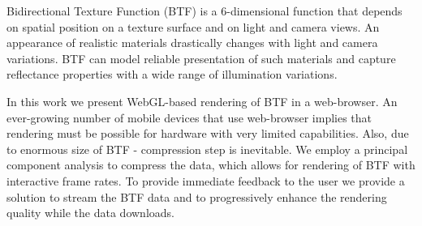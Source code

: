 Bidirectional Texture Function (BTF) is a 6-dimensional function that depends on spatial position on a texture surface and on light and camera views.
An appearance of realistic materials drastically changes with light and camera variations.
 BTF can model reliable presentation of such materials and capture reflectance properties with a wide range of illumination variations.

In this work we present WebGL-based rendering of BTF in a web-browser. 
An ever-growing number of mobile devices that use web-browser implies that rendering must be possible for hardware with very limited capabilities.
Also, due to enormous size of BTF - compression step is inevitable. 
We employ a principal component analysis to compress the data, which allows for rendering of BTF with interactive frame rates. 
To provide immediate feedback to the user we provide a solution to stream the BTF data and to progressively enhance the rendering quality while the data downloads. 




